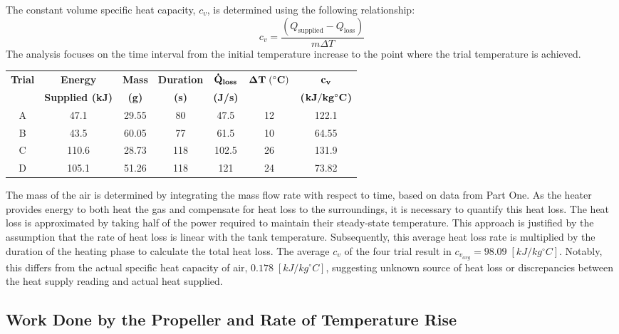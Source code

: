 \documentclass[12pt]{article}
\begin{document}
The constant volume specific heat capacity, \(c_v\), is determined using the following relationship:
\[
c_v = \frac{(Q_{\text{supplied}} - Q_{\text{loss}})}{m\Delta T}
\]
The analysis focuses on the time interval from the initial temperature increase to the point where the trial temperature is achieved.

\begin{table}[h!]
\centering
\begin{tabular}{|c|c|c|c|c|c|c|}
\hline
\textbf{Trial} & \textbf{Energy} & \textbf{Mass} & \textbf{Duration} & \textbf{$\bf \dot Q_{loss}$} & \textbf{$\bf \Delta T \; (^{\circ}C)$} & \textbf{$\bf c_v$} \\
& \textbf{Supplied (kJ)} & \textbf{(g)} & \textbf{(s)} & \textbf{(J/s)} &  & \textbf{($\bf kJ/ kg ^{\circ}C$)} \\
\hline
A & 47.1 & 29.55 & 80 & 47.5 & 12 & 122.1 \\
\hline
B & 43.5 & 60.05 & 77 & 61.5 & 10 & 64.55 \\
\hline
C & 110.6 & 28.73 & 118 & 102.5 & 26 & 131.9 \\
\hline
D & 105.1 & 51.26 & 118 & 121 & 24 & 73.82 \\
\hline
\end{tabular}
\end{table}

The mass of the air is determined by integrating the mass flow rate with respect to time, based on data from Part One. As the heater provides energy to both heat the gas and compensate for heat loss to the surroundings, it is necessary to quantify this heat loss. The heat loss is approximated by taking half of the power required to maintain their steady-state temperature. This approach is justified by the assumption that the rate of heat loss is linear with the tank temperature. Subsequently, this average heat loss rate is multiplied by the duration of the heating phase to calculate the total heat loss. The average $c_v$ of the four trial result in $c_{v_{avg}} = 98.09 \; [kJ/ kg ^{\circ}C]$. Notably, this differs from the actual specific heat capacity of air, $0.178 \; [kJ/ kg ^{\circ}C]$, suggesting unknown source of heat loss or discrepancies between the heat supply reading and actual heat supplied.

\subsection{Work Done by the Propeller and Rate of Temperature Rise}
\end{document}
